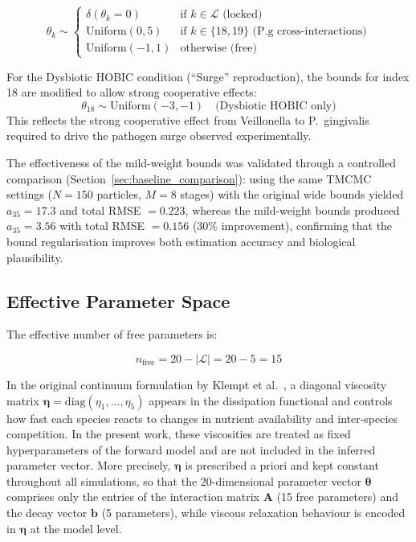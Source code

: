 \documentclass[11pt,a4paper]{article}
\begin{document}
\begin{equation}
\theta_k \sim \begin{cases}
\delta(\theta_k = 0) & \text{if } k \in \mathcal{L} \text{ (locked)} \\
\text{Uniform}(0, 5) & \text{if } k \in \{18, 19\} \text{ (P.g cross-interactions)} \\
\text{Uniform}(-1, 1) & \text{otherwise (free)}
\end{cases}
\end{equation}

For the Dysbiotic HOBIC condition (``Surge'' reproduction), the bounds for index 18 are modified to allow strong cooperative effects:
\begin{equation}
\theta_{18} \sim \text{Uniform}(-3, -1) \quad \text{(Dysbiotic HOBIC only)}
\end{equation}
This reflects the strong cooperative effect from Veillonella to P.~gingivalis required to drive the pathogen surge observed experimentally.

The effectiveness of the mild-weight bounds was validated through a controlled comparison (Section~\ref{sec:baseline_comparison}): using the same TMCMC settings ($N=150$ particles, $M=8$ stages) with the original wide bounds yielded $a_{35} = 17.3$ and total RMSE $= 0.223$, whereas the mild-weight bounds produced $a_{35} = 3.56$ with total RMSE $= 0.156$ (30\% improvement), confirming that the bound regularisation improves both estimation accuracy and biological plausibility.

\subsection{Effective Parameter Space}

The effective number of free parameters is:

\begin{equation}
n_{\text{free}} = 20 - |\mathcal{L}| = 20 - 5 = 15
\end{equation}

In the original continuum formulation by Klempt et al.~\cite{Klempt2025ContinuumBiofilm}, a diagonal viscosity matrix $\boldsymbol{\eta} = \mathrm{diag}(\eta_1,\dots,\eta_5)$ appears in the dissipation functional and controls how fast each species reacts to changes in nutrient availability and inter-species competition. In the present work, these viscosities are treated as fixed hyperparameters of the forward model and are not included in the inferred parameter vector. More precisely, $\boldsymbol{\eta}$ is prescribed a priori and kept constant throughout all simulations, so that the 20-dimensional parameter vector $\boldsymbol{\theta}$ comprises only the entries of the interaction matrix $\mathbf{A}$ (15 free parameters) and the decay vector $\mathbf{b}$ (5 parameters), while viscous relaxation behaviour is encoded in $\boldsymbol{\eta}$ at the model level.
\end{document}
